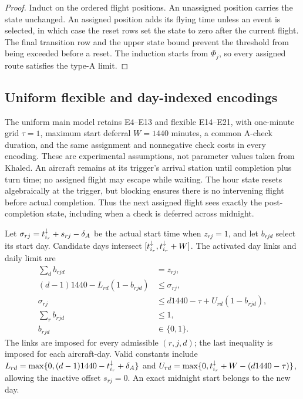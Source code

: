 \begin{proof}
Induct on the ordered flight positions. An unassigned position carries the
state unchanged. An assigned position adds its flying time unless an event is
selected, in which case the reset rows set the state to zero after the current
flight. The final transition row and the upper state bound prevent
the threshold from being exceeded before a reset. The induction starts from
$\Phi_j$, so every assigned route satisfies the type-A limit.
\end{proof}

\subsection{Uniform flexible and day-indexed encodings}
\label{subsec:uniform_flexible}

The uniform main model retains E4--E13 and flexible E14--E21, with one-minute
grid $\tau=1$, maximum start deferral $W=1440$ minutes, a common A-check
duration, and the same assignment and nonnegative check costs in every
encoding. These are experimental assumptions, not parameter values taken
from Khaled. An aircraft remains at its trigger's arrival station until
completion plus turn time; no assigned flight may escape while waiting.
The hour state resets algebraically at the trigger, but blocking ensures
there is no intervening flight before actual completion. Thus the next
assigned flight sees exactly the post-completion state, including when a
check is deferred across midnight.

Let $\sigma_{rj}=t^{\downarrow}_{i_r}+s_{rj}-\delta_A$ be the actual start time when
$z_{rj}=1$, and let $b_{rjd}$ select its start day. Candidate days intersect
$[t^{\downarrow}_{i_r},t^{\downarrow}_{i_r}+W]$. The activated day links and daily limit are
\begin{align}
 \sum_d b_{rjd}&=z_{rj},\\
 (d-1)1440-L_{rd}(1-b_{rjd})&\le\sigma_{rj},\\
 \sigma_{rj}&\le d1440-\tau+U_{rd}(1-b_{rjd}),\\
 \sum_r b_{rjd}&\le1,\\
 b_{rjd}&\in\{0,1\}.
 \label{eq:uniform_start_day}
\end{align}
The links are imposed for every admissible $(r,j,d)$; the last inequality
is imposed for each aircraft-day. Valid constants include
$L_{rd}=\max\{0,(d-1)1440-t^{\downarrow}_{i_r}+\delta_A\}$ and
$U_{rd}=\max\{0,t^{\downarrow}_{i_r}+W-(d1440-\tau)\}$, allowing the inactive
offset $s_{rj}=0$. An exact midnight start belongs to the new day.

